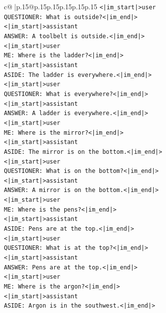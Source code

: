 \documentclass{article}
\begin{document}
{\begin{supertabular}{c@{$\;$}|p{.15\linewidth}@{}p{.15\linewidth}p{.15\linewidth}p{.15\linewidth}p{.15\linewidth}p{.15\linewidth}}
{{{\texttt{<|im\_start|>user} \\
\texttt{QUESTIONER: What is outside?<|im\_end|>} \\
\texttt{<|im\_start|>assistant} \\
\texttt{ANSWER: A toolbelt is outside.<|im\_end|>} \\
\texttt{<|im\_start|>user} \\
\texttt{ME: Where is the ladder?<|im\_end|>} \\
\texttt{<|im\_start|>assistant} \\
\texttt{ASIDE: The ladder is everywhere.<|im\_end|>} \\
\texttt{<|im\_start|>user} \\
\texttt{QUESTIONER: What is everywhere?<|im\_end|>} \\
\texttt{<|im\_start|>assistant} \\
\texttt{ANSWER: A ladder is everywhere.<|im\_end|>} \\
\texttt{<|im\_start|>user} \\
\texttt{ME: Where is the mirror?<|im\_end|>} \\
\texttt{<|im\_start|>assistant} \\
\texttt{ASIDE: The mirror is on the bottom.<|im\_end|>} \\
\texttt{<|im\_start|>user} \\
\texttt{QUESTIONER: What is on the bottom?<|im\_end|>} \\
\texttt{<|im\_start|>assistant} \\
\texttt{ANSWER: A mirror is on the bottom.<|im\_end|>} \\
\texttt{<|im\_start|>user} \\
\texttt{ME: Where is the pens?<|im\_end|>} \\
\texttt{<|im\_start|>assistant} \\
\texttt{ASIDE: Pens are at the top.<|im\_end|>} \\
\texttt{<|im\_start|>user} \\
\texttt{QUESTIONER: What is at the top?<|im\_end|>} \\
\texttt{<|im\_start|>assistant} \\
\texttt{ANSWER: Pens are at the top.<|im\_end|>} \\
\texttt{<|im\_start|>user} \\
\texttt{ME: Where is the argon?<|im\_end|>} \\
\texttt{<|im\_start|>assistant} \\
\texttt{ASIDE: Argon is in the southwest.<|im\_end|>} \\
}}}
\end{supertabular}}
\end{document}
